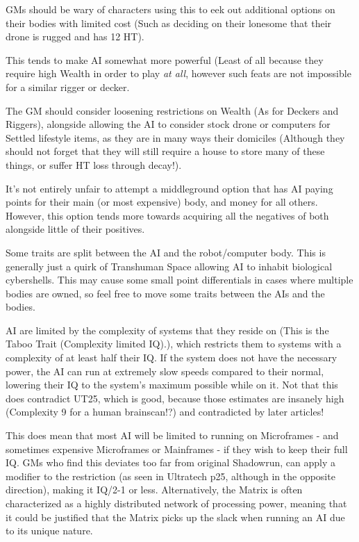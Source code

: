 \begin{multicols*}{3}
\begin{itemize}
		GMs should be wary of characters using this to eek out additional options on their bodies with limited cost (Such as deciding on their lonesome that their drone is rugged and has 12 HT). 
		
		This tends to make AI somewhat more powerful (Least of all because they require high Wealth in order to play \textit{at all}, however such feats are not impossible for a similar rigger or decker. 
		
		The GM should consider loosening restrictions on Wealth (As for Deckers and Riggers), alongside allowing the AI to consider stock drone or computers for Settled lifestyle items, as they are in many ways their domiciles (Although they should not forget that they will still require a house to store many of these things, or suffer HT loss through decay!).
		
		It's not entirely unfair to attempt a middleground option that has AI paying points for their main (or most expensive) body, and money for all others. However, this option tends more towards acquiring all the negatives of both alongside little of their positives.
		
	\end{itemize}
	
	Some traits are split between the AI and the robot/computer body. This is generally just a quirk of Transhuman Space allowing AI to inhabit biological cybershells. This may cause some small point differentials in cases where multiple bodies are owned, so feel free to move some traits between the AIs and the bodies.
	
	AI are limited by the complexity of systems that they reside on (This is the Taboo Trait (Complexity limited IQ).), which restricts them to systems with a complexity of at least half their IQ. If the system does not have the necessary power, the AI can run at extremely slow speeds compared to their normal, lowering their IQ to the system's maximum possible while on it. Not that this does contradict UT25, which is good, because those estimates are insanely high (Complexity 9 for a human brainscan!?) and contradicted by later articles!
	
	This does mean that most AI will be limited to running on Microframes - and sometimes expensive Microframes or Mainframes - if they wish to keep their full IQ. GMs who find this deviates too far from original Shadowrun, can apply a modifier to the restriction (as seen in Ultratech p25, although in the opposite direction), making it IQ/2-1 or less. Alternatively, the Matrix is often characterized as a highly distributed network of processing power, meaning that it could be justified that the Matrix picks up the slack when running an AI due to its unique nature.
	

\end{multicols*}
